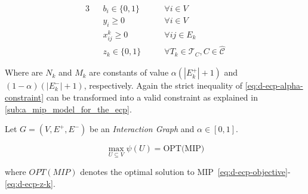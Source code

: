 \begin{alignat}{3}
	\label{eq:d-ecp-b-i}
	                                           &                                           & b _{i} \in \{0, 1\} \quad\quad                                                & \forall i \in V                           \\
	\label{eq:d-ecp-y-i}
	                                           &                                           & y _{i} \geq 0 \quad\quad                                                      & \forall i \in V                           \\
	\label{eq:d-ecp-x-ij}
	                                           &                                           & x _{ij} ^{k}  \geq 0 \quad\quad                                               & \forall ij \in E_k                        \\
	\label{eq:d-ecp-z-k}
	                                           &                                           & z _{k} \in \{0, 1\} \quad\quad                                                & \forall T_{k} \in \mathcal{T} _{C}, C \in
	\hat{\mathcal{C}}
\end{alignat}

Where are $N_k$ and $M_k$ are constants of value $\alpha (|E_k^{+}| + 1)$ and $(1 -
	\alpha ) ( |E^{-}_k| + 1)$, respectively.
Again the strict inequality of \eqref{eq:d-ecp-alpha-constraint} can be
transformed into a valid constraint as explained in
\autoref{sub:a_mip_model_for_the_ecp}.

\begin{theorem}
	\label{th:d-ecp-mip}
	Let $G = (V, E^{+}, E^{-})$ be an \emph{Interaction Graph} and $\alpha \in
		[0, 1]$.

	\begin{equation}
		\max_{U \subseteq V} \psi(U) = \text{OPT(MIP)}
	\end{equation}

	where $OPT(MIP)$ denotes the optimal solution to
	MIP~\eqref{eq:d-ecp-objective}-\eqref{eq:d-ecp-z-k}.
\end{theorem}


